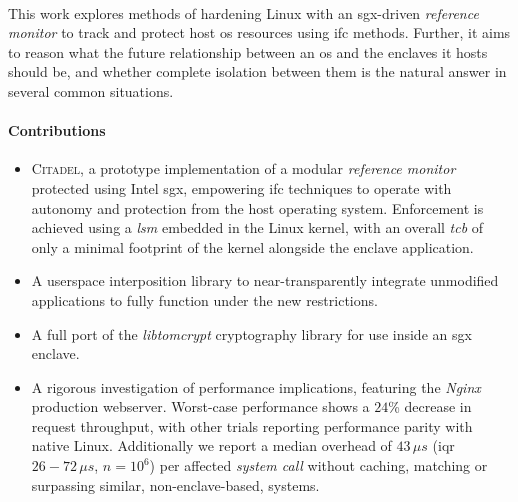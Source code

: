 \paragraph{} This work explores methods of hardening Linux with an \acrshort{sgx}-driven \textit{reference monitor} to track and protect host \acrshort{os} resources using \acrshort{ifc} methods. Further, it aims to reason what the future relationship between an \acrshort{os} and the enclaves it hosts should be, and whether complete isolation between them is the natural answer in several common situations.


\paragraph{Contributions}
\begin{itemize}
    \item \textsc{Citadel}, a prototype implementation of a modular \textit{reference monitor} protected using Intel \acrshort{sgx}, empowering \acrshort{ifc} techniques to operate with autonomy and protection from the host operating system. Enforcement is achieved using a \textit{\acrfull{lsm}} embedded in the Linux kernel, with an overall \textit{\acrshort{tcb}} of only a minimal footprint of the kernel alongside the enclave application.
    \item A userspace interposition library to near-transparently integrate unmodified applications to fully function under the new restrictions.
    \item A full port of the \textit{libtomcrypt} cryptography library for use inside an \acrshort{sgx} enclave.
    \item A rigorous investigation of performance implications, featuring the \textit{Nginx} production webserver. Worst-case performance shows a $24$\% decrease in request throughput, with other trials reporting performance parity with native Linux. Additionally we report a median overhead of $43\,\mu s$ (\acrshort{iqr} $26-72\,\mu s$, $n = 10^6$) per affected \textit{system call} without caching, matching or surpassing similar, non-enclave-based, systems.
\end{itemize}